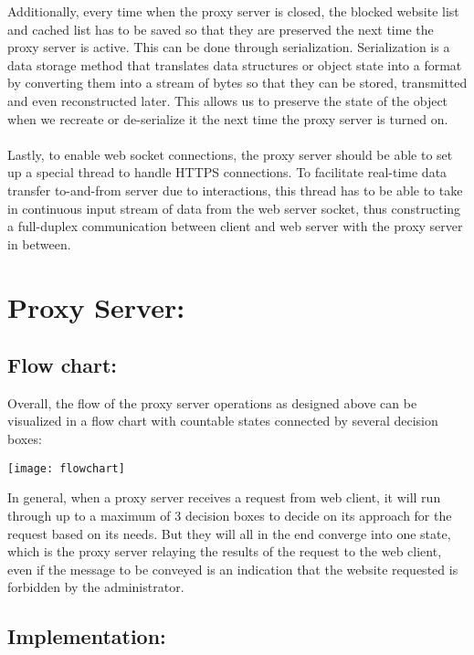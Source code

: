 \documentclass[12pt]{article}%
\begin{document}
Additionally, every time when the proxy server is closed, the blocked website list and cached list has to be saved so that they are preserved the next time the proxy server is active. This can be done through serialization. Serialization is a data storage method that translates data structures or object state into a format by converting them into a stream of bytes so that they can be stored, transmitted and even reconstructed later. This allows us to preserve the state of the object when we recreate or de-serialize it the next time the proxy server is turned on.  \\ \\
Lastly, to enable web socket connections, the proxy server should be able to set up a special thread to handle HTTPS connections. To facilitate real-time data transfer to-and-from server due to interactions, this thread has to be able to take in continuous input stream of data from the web server socket, thus constructing a full-duplex communication between client and web server with the proxy server in between. \\

\newpage
\section*{Proxy Server:}
\subsection*{Flow chart:}
Overall, the flow of the proxy server operations as designed above can be visualized in a flow chart with countable states connected by several decision boxes: \\
\begin{center}
\texttt{[image: flowchart]}
\end{center}
In general, when a proxy server receives a request from web client, it will run through up to a maximum of 3 decision boxes to decide on its approach for the request based on its needs. But they will all in the end converge into one state, which is the proxy server relaying the results of the request to the web client, even if the message to be conveyed is an indication that the website requested is forbidden by the administrator. \\
\subsection*{Implementation:}
\end{document}
